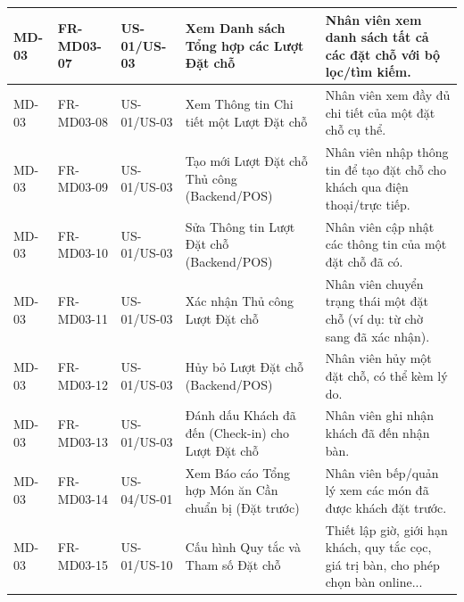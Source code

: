 \begin{longtable}{|m{2cm}|m{2.5cm}|m{2cm}|m{4.5cm}|m{4cm}|}
MD-03 & FR-MD03-07 & US-01/US-03 & Xem Danh sách Tổng hợp các Lượt Đặt chỗ & Nhân viên xem danh sách tất cả các đặt chỗ với bộ lọc/tìm kiếm. \\
\hline
MD-03 & FR-MD03-08 & US-01/US-03 & Xem Thông tin Chi tiết một Lượt Đặt chỗ & Nhân viên xem đầy đủ chi tiết của một đặt chỗ cụ thể. \\
\hline
MD-03 & FR-MD03-09 & US-01/US-03 & Tạo mới Lượt Đặt chỗ Thủ công (Backend/POS) & Nhân viên nhập thông tin để tạo đặt chỗ cho khách qua điện thoại/trực tiếp. \\
\hline
MD-03 & FR-MD03-10 & US-01/US-03 & Sửa Thông tin Lượt Đặt chỗ (Backend/POS) & Nhân viên cập nhật các thông tin của một đặt chỗ đã có. \\
\hline
MD-03 & FR-MD03-11 & US-01/US-03 & Xác nhận Thủ công Lượt Đặt chỗ & Nhân viên chuyển trạng thái một đặt chỗ (ví dụ: từ chờ sang đã xác nhận). \\
\hline
MD-03 & FR-MD03-12 & US-01/US-03 & Hủy bỏ Lượt Đặt chỗ (Backend/POS) & Nhân viên hủy một đặt chỗ, có thể kèm lý do. \\
\hline
MD-03 & FR-MD03-13 & US-01/US-03 & Đánh dấu Khách đã đến (Check-in) cho Lượt Đặt chỗ & Nhân viên ghi nhận khách đã đến nhận bàn. \\
\hline
MD-03 & FR-MD03-14 & US-04/US-01 & Xem Báo cáo Tổng hợp Món ăn Cần chuẩn bị (Đặt trước) & Nhân viên bếp/quản lý xem các món đã được khách đặt trước. \\
\hline

MD-03 & FR-MD03-15 & US-01/US-10 & Cấu hình Quy tắc và Tham số Đặt chỗ & Thiết lập giờ, giới hạn khách, quy tắc cọc, giá trị bàn, cho phép chọn bàn online... \\
\hline

\end{longtable}



